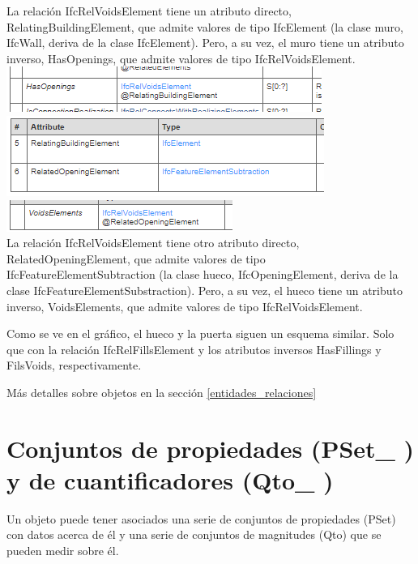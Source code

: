 \documentclass[spanish,12pt,a4paper,final,oneside]{book}
\begin{document}
La relación IfcRelVoidsElement tiene un atributo directo, RelatingBuildingElement, que admite valores de tipo IfcElement (la clase muro, IfcWall, deriva de la clase IfcElement). Pero, a su vez, el muro tiene un atributo inverso, HasOpenings, que admite valores de tipo IfcRelVoidsElement.
\vspace{0.1cm}
\\ \includegraphics[scale=0.8]{atributo HasOpenings}
\vspace{0.1cm}
\\ \includegraphics[scale=0.8]{atributos de IfcRelVoidsElement}
\\ \includegraphics[scale=0.8]{atributo VoidsElements}
\\La relación IfcRelVoidsElement tiene otro atributo directo, RelatedOpeningElement, que admite valores de tipo IfcFeatureElementSubtraction (la clase hueco, IfcOpeningElement, deriva de la clase IfcFeatureElementSubstraction). Pero, a su vez, el hueco tiene un atributo inverso, VoidsElements, que admite valores de tipo IfcRelVoidsElement.

Como se ve en el gráfico, el hueco y la puerta siguen un esquema similar. Solo que con la relación IfcRelFillsElement y los atributos inversos HasFillings y FilsVoids, respectivamente.

\vspace{0.5cm}
Más detalles sobre objetos en la sección \ref{entidades_relaciones}




\newpage
\section{Conjuntos de propiedades (PSet\_ ) y de cuantificadores (Qto\_ )}

Un objeto puede tener asociados una serie de conjuntos de propiedades (PSet) con datos acerca de él y una serie de conjuntos de magnitudes (Qto) que se pueden medir sobre él.
\end{document}
